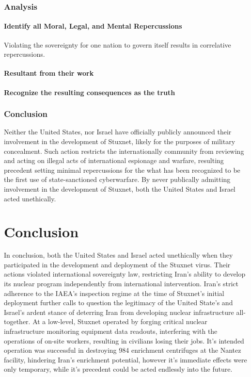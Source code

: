 \documentclass[12pt]{article}
\begin{document}
\begin{multicols}{2}
\subsubsection{Analysis}

\paragraph{Identify all Moral, Legal, and Mental Repercussions}

Violating the sovereignty for one nation to govern itself results in correlative repercussions.

\paragraph{Resultant from their work}

\paragraph{Recognize the resulting consequences as the truth}

\subsubsection{Conclusion}

Neither the United States, nor Israel have officially publicly announced their involvement in the development of Stuxnet, likely for the purposes of military concealment. Such action restricts the internationally community from reviewing and acting on illegal acts of international espionage and warfare, resulting precedent setting minimal repercussions for the what has been recognized to be the first use of state-sanctioned cyberwarfare. By never publically admitting involvement in the development of Stuxnet, both the United States and Israel acted unethically.


\section{Conclusion}

In conclusion, both the United States and Israel acted unethically when they participated in the development and deployment of the Stuxnet virus. Their actions violated international sovereignty law, restricting Iran's ability to develop its nuclear program independently from international intervention. Iran's strict adherence to the IAEA's inspection regime at the time of Stuxnet's initial deployment further calls to question the legitimacy of the United State's and Israel's ardent stance of deterring Iran from developing nuclear infrastructure all-together. At a low-level, Stuxnet operated by forging critical nuclear infrastructure monitoring equipment data readouts, interfering with the operations of on-site workers, resulting in civilians losing their jobs. It's intended operation was successful in destroying 984 enrichment centrifuges at the Nantez facility, hindering Iran's enrichment potential, however it's immediate effects were only temporary, while it's precedent could be acted endlessly into the future.
 


\end{multicols}
\end{document}
